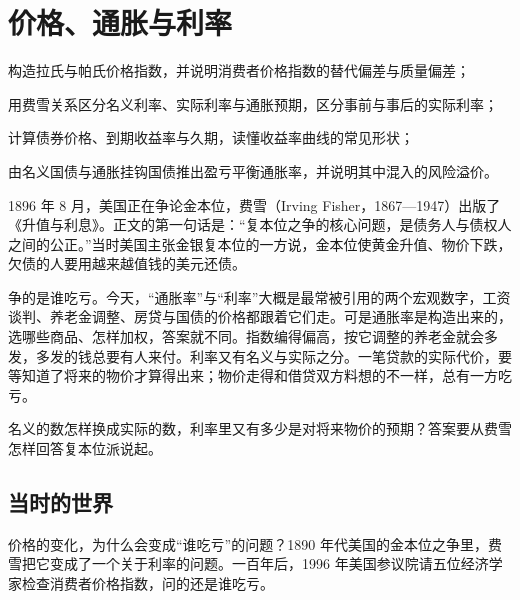 \chapter{价格、通胀与利率}\label{ch:prices}

\begin{chapterguide}
\begin{guidegoals}
\item 构造拉氏与帕氏价格指数，并说明消费者价格指数的替代偏差与质量偏差；
\item 用费雪关系区分名义利率、实际利率与通胀预期，区分事前与事后的实际利率；
\item 计算债券价格、到期收益率与久期，读懂收益率曲线的常见形状；
\item 由名义国债与通胀挂钩国债推出盈亏平衡通胀率，并说明其中混入的风险溢价。
\end{guidegoals}
\end{chapterguide}

1896 年 8 月，美国正在争论金本位，费雪（Irving Fisher，1867—1947）出版了《升值与利息》。正文的第一句话是：“复本位之争的核心问题，是债务人与债权人之间的公正。”\cite{fisher1896}当时美国主张金银复本位的一方说，金本位使黄金升值、物价下跌，欠债的人要用越来越值钱的美元还债。

争的是谁吃亏。今天，“通胀率”与“利率”大概是最常被引用的两个宏观数字，工资谈判、养老金调整、房贷与国债的价格都跟着它们走。可是通胀率是构造出来的，选哪些商品、怎样加权，答案就不同。指数编得偏高，按它调整的养老金就会多发，多发的钱总要有人来付。利率又有名义与实际之分。一笔贷款的实际代价，要等知道了将来的物价才算得出来；物价走得和借贷双方料想的不一样，总有一方吃亏。

名义的数怎样换成实际的数，利率里又有多少是对将来物价的预期？答案要从费雪怎样回答复本位派说起。

\section{当时的世界}\label{sec:prices-world}

价格的变化，为什么会变成“谁吃亏”的问题？1890 年代美国的金本位之争里，费雪把它变成了一个关于利率的问题。一百年后，1996 年美国参议院请五位经济学家检查消费者价格指数，问的还是谁吃亏。


